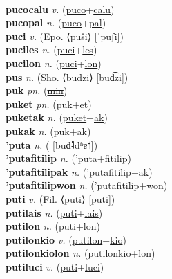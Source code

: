  \label{pucolonpatolon} \\
\textbf{pucocalu} \textit{v.} (\hyperref[puco]{puco}+\hyperref[calu]{calu})
 \label{pucocalu} \\
\textbf{pucopal} \textit{n.} (\hyperref[puco]{puco}+\hyperref[pal]{pal})
 \label{pucopal} \\
\textbf{puci} \textit{v.} (Epo. ⟨puŝi⟩ [ˈpuʃi])
 \label{puci} \\
\textbf{puciles} \textit{n.} (\hyperref[puci]{puci}+\hyperref[les]{les})
 \label{puciles} \\
\textbf{pucilon} \textit{n.} (\hyperref[puci]{puci}+\hyperref[lon]{lon})
 \label{pucilon} \\
\textbf{pus} \textit{n.} (Sho. ⟨budzi⟩ [bud͡zi])
 \label{pus} \\
\textbf{puk} \textit{pn.} (\hyperref[min]{\sout{min}})
 \label{puk} \\
\textbf{puket} \textit{pn.} (\hyperref[puk]{puk}+\hyperref[et]{et})
 \label{puket} \\
\textbf{puketak} \textit{n.} (\hyperref[puket]{puket}+\hyperref[ak]{ak})
 \label{puketak} \\
\textbf{pukak} \textit{n.} (\hyperref[puk]{puk}+\hyperref[ak]{ak})
 \label{pukak} \\
\textbf{'puta} \textit{n.} ( [bud̚˨dʱɐ˦])
 \label{'puta} \\
\textbf{'putafitilip} \textit{n.} (\hyperref['puta]{'puta}+\hyperref[fitilip]{fitilip})
 \label{'putafitilip} \\
\textbf{'putafitilipak} \textit{n.} (\hyperref['putafitilip]{'putafitilip}+\hyperref[ak]{ak})
 \label{'putafitilipak} \\
\textbf{'putafitilipwon} \textit{n.} (\hyperref['putafitilip]{'putafitilip}+\hyperref[won]{won})
 \label{'putafitilipwon} \\
\textbf{puti} \textit{v.} (Fil. ⟨puti⟩ [puti])
 \label{puti} \\
\textbf{putilais} \textit{n.} (\hyperref[puti]{puti}+\hyperref[lais]{lais})
 \label{putilais} \\
\textbf{putilon} \textit{n.} (\hyperref[puti]{puti}+\hyperref[lon]{lon})
 \label{putilon} \\
\textbf{putilonkio} \textit{v.} (\hyperref[putilon]{putilon}+\hyperref[kio]{kio})
 \label{putilonkio} \\
\textbf{putilonkiolon} \textit{n.} (\hyperref[putilonkio]{putilonkio}+\hyperref[lon]{lon})
 \label{putilonkiolon} \\
\textbf{putiluci} \textit{v.} (\hyperref[puti]{puti}+\hyperref[luci]{luci})
